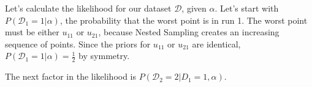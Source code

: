 \documentclass[a4paper, 11pt]{article}
\begin{document}
Let's calculate the likelihood for our dataset $\mathcal{D}$, given $\alpha$.
Let's start with $P(\mathcal{D}_1 = 1 | \alpha)$, the probability that the
worst point is in run 1. The worst point must be either
$u_{11}$ or $u_{21}$, because Nested Sampling creates an increasing sequence
of points. Since the priors for $u_{11}$ or $u_{21}$ are identical,
$P(\mathcal{D}_1 = 1 | \alpha) = \frac{1}{2}$ by symmetry.

The next factor in the likelihood is
$P(\mathcal{D}_2 = 2 | D_1 = 1, \alpha)$.
\end{document}
